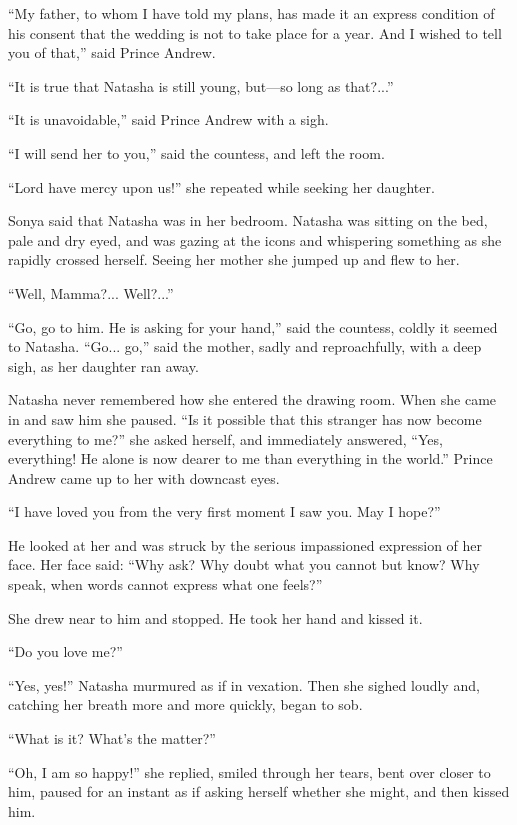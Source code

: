 ``My father, to whom I have told my plans, has made it an express
condition of his consent that the wedding is not to take place
for a year. And I wished to tell you of that,'' said Prince
Andrew.

``It is true that Natasha is still young, but---so long as
that?...''

``It is unavoidable,'' said Prince Andrew with a sigh.

``I will send her to you,'' said the countess, and left the room.

``Lord have mercy upon us!'' she repeated while seeking her
daughter.

Sonya said that Natasha was in her bedroom. Natasha was sitting
on the bed, pale and dry eyed, and was gazing at the icons and
whispering something as she rapidly crossed herself. Seeing her
mother she jumped up and flew to her.

``Well, Mamma?... Well?...''

``Go, go to him. He is asking for your hand,'' said the countess,
coldly it seemed to Natasha. ``Go... go,'' said the mother, sadly
and reproachfully, with a deep sigh, as her daughter ran away.

Natasha never remembered how she entered the drawing room. When
she came in and saw him she paused. ``Is it possible that this
stranger has now become everything to me?'' she asked herself,
and immediately answered, ``Yes, everything! He alone is now
dearer to me than everything in the world.'' Prince Andrew came
up to her with downcast eyes.

``I have loved you from the very first moment I saw you. May I
hope?''

He looked at her and was struck by the serious impassioned
expression of her face. Her face said: ``Why ask? Why doubt what
you cannot but know?  Why speak, when words cannot express what
one feels?''

She drew near to him and stopped. He took her hand and kissed it.

``Do you love me?''

``Yes, yes!'' Natasha murmured as if in vexation. Then she sighed
loudly and, catching her breath more and more quickly, began to
sob.

``What is it? What's the matter?''

``Oh, I am so happy!'' she replied, smiled through her tears,
bent over closer to him, paused for an instant as if asking
herself whether she might, and then kissed him.

